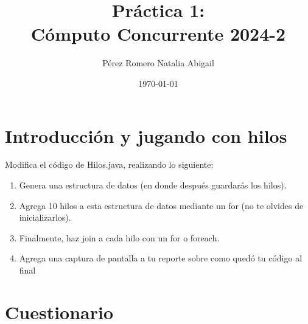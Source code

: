 \documentclass{article}
\title{Práctica 1:  \\ Cómputo Concurrente 2024-2}
\author{Pérez Romero Natalia Abigail}
\date{\today}
\begin{document}
\maketitle

\section{Introducción y jugando con hilos}

Modifica el código de Hilos.java, realizando lo siguiente:
\begin{enumerate}
    \item Genera una estructura de datos (en donde después guardarás los hilos).
    \item Agrega 10 hilos a esta estructura de datos mediante un for (no te olvides de inicializarlos).
    \item Finalmente, haz join a cada hilo con un for o foreach.
    \item Agrega una captura de pantalla a tu reporte sobre como quedó tu código al final
\end{enumerate}

\section{Cuestionario}
\end{document}
